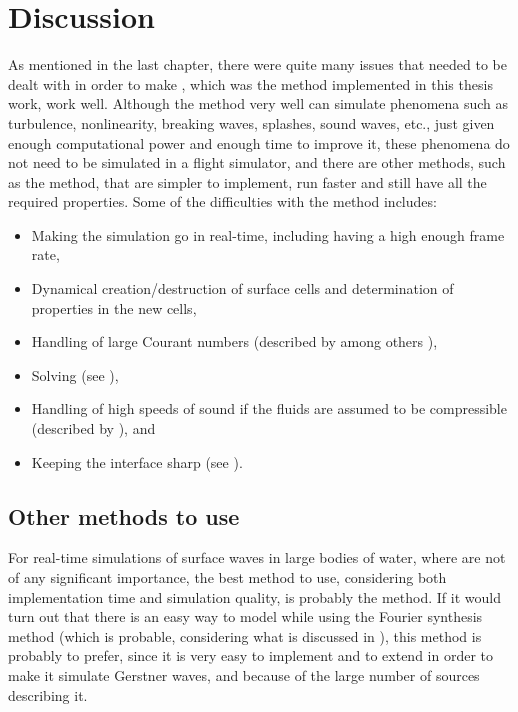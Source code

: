 \chapter{Discussion}
\label{chap:discussion}

As mentioned in the last chapter, there were quite many issues that needed to be dealt with in order to make \thismethod, which was the method implemented in this thesis work, work well. Although the method very well can simulate phenomena such as turbulence, nonlinearity, breaking waves, splashes, sound waves, etc., just given enough computational power and enough time to improve it, these phenomena do not need to be simulated in a flight simulator, and there are other methods, such as the \LPD method, that are simpler to implement, run faster and still have all the required properties. Some of the difficulties with the method includes:

\begin{itemize}
    \item Making the simulation go in real-time, including having a high enough frame rate,
    \item Dynamical creation/destruction of surface cells and determination of properties in the new cells,
    \item Handling of large Courant numbers (described by among others \citet{Stam1999,Lentine2012}),
    \item Solving  (see ),
    \item Handling of high speeds of sound if the fluids are assumed to be compressible (described by \citet{Kwatra2009}), and
    \item Keeping the interface sharp (see ).
\end{itemize}

\section{Other methods to use}

For real-time simulations of surface waves in large bodies of water, where  are not of any significant importance, the best method to use, considering both implementation time and simulation quality, is probably the \LPD method. If it would turn out that there is an easy way to model \FSI while using the Fourier synthesis method (which is probable, considering what is discussed in ), this method is probably to prefer, since it is very easy to implement and to extend in order to make it simulate Gerstner waves, and because of the large number of sources describing it.

